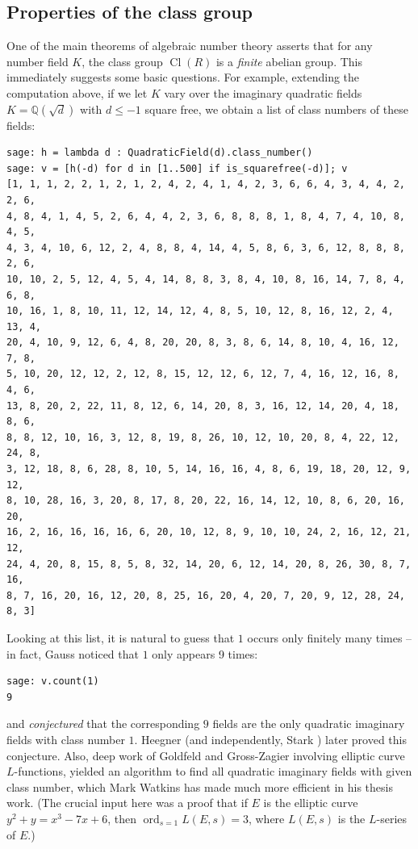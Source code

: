 \documentclass{book}
\theoremstyle{plain}
\theoremstyle{definition}
\numberwithin{equation}{section}
\numberwithin{figure}{section}
\numberwithin{table}{section}
\DeclareMathOperator{\Cl}{Cl}
\DeclareMathOperator{\ord}{ord}
\newcommand{\Q}{\mathbb{Q}}
\begin{document}
\subsection{Properties of the class group}
One of the main theorems of algebraic number theory asserts that
for any number field $K$, the class group $\Cl(R)$ is a {\em finite}
abelian group.   This immediately suggests some basic questions.
For example, extending the computation above,
if we let $K$ vary over the imaginary quadratic fields
$K=\Q(\sqrt{d})$ with $d\leq -1$ square free, we obtain
a list of class numbers of these fields:
\begin{lstlisting}
sage: h = lambda d : QuadraticField(d).class_number()
sage: v = [h(-d) for d in [1..500] if is_squarefree(-d)]; v
[1, 1, 1, 2, 2, 1, 2, 1, 2, 4, 2, 4, 1, 4, 2, 3, 6, 6, 4, 3, 4, 4, 2, 2, 6,
4, 8, 4, 1, 4, 5, 2, 6, 4, 4, 2, 3, 6, 8, 8, 8, 1, 8, 4, 7, 4, 10, 8, 4, 5,
4, 3, 4, 10, 6, 12, 2, 4, 8, 8, 4, 14, 4, 5, 8, 6, 3, 6, 12, 8, 8, 8, 2, 6,
10, 10, 2, 5, 12, 4, 5, 4, 14, 8, 8, 3, 8, 4, 10, 8, 16, 14, 7, 8, 4, 6, 8,
10, 16, 1, 8, 10, 11, 12, 14, 12, 4, 8, 5, 10, 12, 8, 16, 12, 2, 4, 13, 4,
20, 4, 10, 9, 12, 6, 4, 8, 20, 20, 8, 3, 8, 6, 14, 8, 10, 4, 16, 12, 7, 8,
5, 10, 20, 12, 12, 2, 12, 8, 15, 12, 12, 6, 12, 7, 4, 16, 12, 16, 8, 4, 6,
13, 8, 20, 2, 22, 11, 8, 12, 6, 14, 20, 8, 3, 16, 12, 14, 20, 4, 18, 8, 6,
8, 8, 12, 10, 16, 3, 12, 8, 19, 8, 26, 10, 12, 10, 20, 8, 4, 22, 12, 24, 8,
3, 12, 18, 8, 6, 28, 8, 10, 5, 14, 16, 16, 4, 8, 6, 19, 18, 20, 12, 9, 12,
8, 10, 28, 16, 3, 20, 8, 17, 8, 20, 22, 16, 14, 12, 10, 8, 6, 20, 16, 20,
16, 2, 16, 16, 16, 16, 6, 20, 10, 12, 8, 9, 10, 10, 24, 2, 16, 12, 21, 12,
24, 4, 20, 8, 15, 8, 5, 8, 32, 14, 20, 6, 12, 14, 20, 8, 26, 30, 8, 7, 16,
8, 7, 16, 20, 16, 12, 20, 8, 25, 16, 20, 4, 20, 7, 20, 9, 12, 28, 24, 8, 3]
\end{lstlisting}
Looking at this list, it is natural to guess that $1$ occurs only finitely
many times -- in fact, Gauss noticed that $1$ only appears 9 times:
\begin{lstlisting}
sage: v.count(1)
9
\end{lstlisting}
and {\em conjectured} that the corresponding $9$ fields are the only
quadratic imaginary fields with class number $1$.
Heegner \cite{heegner1952diophantische} (and independently, Stark \cite{stark1969gap}) later proved this conjecture.
Also, deep work of Goldfeld and Gross-Zagier involving elliptic
curve $L$-functions, yielded an algorithm to find all quadratic
imaginary fields with given class number, which Mark Watkins has made
much more efficient in his thesis work.  (The crucial input here
was a proof that if $E$ is the elliptic curve $y^2 + y = x^3 - 7x + 6$,
then $\ord_{s=1}L(E,s)=3$, where $L(E,s)$ is the $L$-series
of $E$.)
\end{document}
